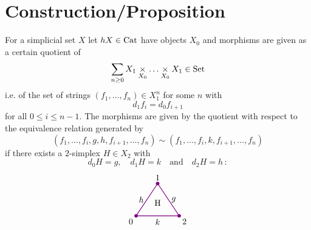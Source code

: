     \section{Construction/Proposition}
        For a simplicial set $X$ let $hX \in \operatorname{Cat}$ have objects $X_0$ and morphisms are given as a certain quotient of
        \begin{equation*}
            \sum_{n \geq 0} X_1 \underset{X_0}{\times} \ldots \underset{X_0}{\times} X_1 \in \operatorname{Set}
        \end{equation*}
        i.e. of the set of strings $(f_1, \ldots, f_n) \in X^n_1$ for some $n$ with
        \begin{equation*}
            d_1 f_i = d_0 f_{i+1}
        \end{equation*}
        for all $0 \leq i \leq n - 1$. The morphisms are given by the quotient with respect to the equivalence relation generated by
        \begin{equation*}
            (f_1, \ldots, f_i, g, h, f_{i+1}, \ldots, f_n) \sim (f_1, \ldots, f_i, k, f_{i+1}, \ldots, f_n)
        \end{equation*}
        if there exists a $2$-simplex $H \in X_2$ with
        \begin{equation*}
            d_0 H = g, \quad d_1 H = k \quad \text{and} \quad d_2 H = h \,\colon
        \end{equation*}
        \begin{equation*}
            \begin{tikzpicture}[
                scale=0.9, 
                thick, 
                color=violet, 
                every node/.style={text=black},
                dot/.style={circle, fill=violet, inner sep=1.5pt, outer sep=0pt}
            ]

                \coordinate (O) at (0,0);       %
                \coordinate (A) at (1, 1.5);    %
                \coordinate (B) at (2, 0);      %

                \draw (O) -- node[left] {$h$} (A) 
                    -- node[right] {$g$} (B) 
                    -- node[below] {$k$} cycle;

                \node[dot] at (O) {};
                \node[dot] at (A) {};
                \node[dot] at (B) {};

                \node[below left] at (O) {0};
                \node[above] at (A) {1};
                \node[below right] at (B) {2};

                \node[scale=1.0] at (1, 0.6) {H};

            \end{tikzpicture}        
        \end{equation*}
